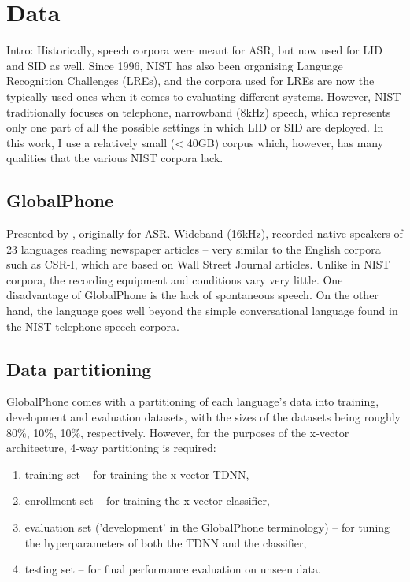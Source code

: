 \documentclass[bsc,frontabs,twoside,singlespacing,parskip,deptreport]{infthesis}
\begin{document}
\chapter{Data}{
  Intro: Historically, speech corpora were meant for ASR, but now used for LID and SID as well. Since 1996, NIST has also been organising Language Recognition Challenges (LREs), and the corpora used for LREs are now the typically used ones when it comes to evaluating different systems. However, NIST traditionally focuses on telephone, narrowband (8kHz) speech, which represents only one part of all the possible settings in which LID or SID are deployed. In this work, I use a relatively small (< 40GB) corpus which, however, has many qualities that the various NIST corpora lack.

  \section{GlobalPhone}{
    Presented by \cite{Schultz_et_al_2013}, originally for ASR. Wideband (16kHz), recorded native speakers of 23 languages reading newspaper articles -- very similar to the English corpora such as CSR-I, which are based on Wall Street Journal articles. Unlike in NIST corpora, the recording equipment and conditions vary very little. One disadvantage of GlobalPhone is the lack of spontaneous speech. On the other hand, the language goes well beyond the simple conversational language found in the NIST telephone speech corpora.
  }

  \section{Data partitioning}{
    GlobalPhone comes with a partitioning of each language's data into training, development and evaluation datasets, with the sizes of the datasets being roughly 80\%, 10\%, 10\%, respectively. However, for the purposes of the x-vector architecture, 4-way partitioning is required:
    \begin{enumerate}
      \item{training set -- for training the x-vector TDNN,}
      \item{enrollment set -- for training the x-vector classifier,}
      \item{evaluation set ('development' in the GlobalPhone terminology) -- for tuning the hyperparameters of both the TDNN and the classifier,}
      \item{testing set -- for final performance evaluation on unseen data.}
    \end{enumerate}

}}
\end{document}
